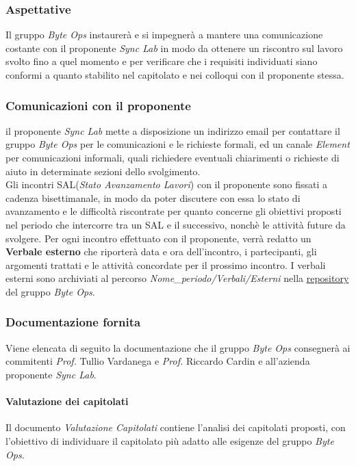 \subsubsection{Aspettative}
Il gruppo \textit{Byte Ops} instaurerà e si impegnerà a mantere una comunicazione costante con il proponente \textit{Sync Lab} in modo da ottenere un riscontro sul lavoro svolto fino a quel momento e per verificare che i requisiti individuati siano conformi a quanto stabilito nel capitolato e nei colloqui con il proponente stessa.\\

\subsubsection{Comunicazioni con il proponente}
il proponente \textit{Sync Lab} mette a disposizione un indirizzo email per contattare il gruppo \textit{Byte Ops} per le comunicazioni e le richieste formali, ed un canale \textit{Element} per comunicazioni informali, quali richiedere eventuali chiarimenti o richieste di aiuto in determinate sezioni dello svolgimento.\\
Gli incontri SAL(\textit{Stato Avanzamento Lavori}) con il proponente sono fissati a cadenza bisettimanale, in modo da poter discutere con essa lo stato di avanzamento e le difficoltà riscontrate per quanto concerne gli obiettivi proposti nel periodo che intercorre tra un SAL e il successivo, nonchè le attività future da svolgere.
Per ogni incontro effettuato con il proponente, verrà redatto un \textbf{Verbale esterno} che riporterà data e ora dell'incontro, i partecipanti, gli argomenti trattati e le attività concordate per il prossimo incontro.
I verbali esterni sono archiviati al percorso \textit{Nome\_periodo/Verbali/Esterni} nella \href{https://github.com/ByteOps-swe/Documents}{repository} del gruppo \textit{Byte Ops}.

\subsubsection {Documentazione fornita}
Viene elencata di seguito la documentazione che il gruppo \textit{Byte Ops} consegnerà ai commitenti \textit{Prof.} Tullio Vardanega e \textit{Prof.} Riccardo Cardin e all'azienda proponente \textit{Sync Lab}.

\paragraph{Valutazione dei capitolati}
Il documento \textit{Valutazione Capitolati} contiene l'analisi dei capitolati proposti, con l'obiettivo di individuare il capitolato più adatto alle esigenze del gruppo \textit{Byte Ops}.


